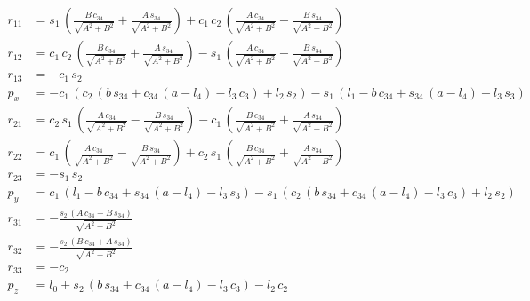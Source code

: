 \documentclass{homework}
\begin{document}
\begin{sol}
\begin{align*} 
r_{11} &= s_{1}\,\left(\frac{B\,c_{34}}{\sqrt{A^2+B^2}}+\frac{A\,s_{34}}{\sqrt{A^2+B^2}}\right)+c_{1}\,c_{2}\,\left(\frac{A\,c_{34}}{\sqrt{A^2+B^2}}-\frac{B\,s_{34}}{\sqrt{A^2+B^2}}\right) \\ 
r_{12} &= c_{1}\,c_{2}\,\left(\frac{B\,c_{34}}{\sqrt{A^2+B^2}}+\frac{A\,s_{34}}{\sqrt{A^2+B^2}}\right)-s_{1}\,\left(\frac{A\,c_{34}}{\sqrt{A^2+B^2}}-\frac{B\,s_{34}}{\sqrt{A^2+B^2}}\right) \\ 
r_{13} &= -c_{1}\,s_{2} \\ 
p_x &= -c_{1}\,\left(c_{2}\,\left(b\,s_{34}+c_{34}\,\left(a-l_{4}\right)-l_{3}\,c_{3}\right)+l_{2}\,s_{2}\right)-s_{1}\,\left(l_{1}-b\,c_{34}+s_{34}\,\left(a-l_{4}\right)-l_{3}\,s_{3}\right) \\ 
r_{21} &= c_{2}\,s_{1}\,\left(\frac{A\,c_{34}}{\sqrt{A^2+B^2}}-\frac{B\,s_{34}}{\sqrt{A^2+B^2}}\right)-c_{1}\,\left(\frac{B\,c_{34}}{\sqrt{A^2+B^2}}+\frac{A\,s_{34}}{\sqrt{A^2+B^2}}\right) \\ 
r_{22} &= c_{1}\,\left(\frac{A\,c_{34}}{\sqrt{A^2+B^2}}-\frac{B\,s_{34}}{\sqrt{A^2+B^2}}\right)+c_{2}\,s_{1}\,\left(\frac{B\,c_{34}}{\sqrt{A^2+B^2}}+\frac{A\,s_{34}}{\sqrt{A^2+B^2}}\right) \\ 
r_{23} &= -s_{1}\,s_{2} \\ 
p_y &= c_{1}\,\left(l_{1}-b\,c_{34}+s_{34}\,\left(a-l_{4}\right)-l_{3}\,s_{3}\right)-s_{1}\,\left(c_{2}\,\left(b\,s_{34}+c_{34}\,\left(a-l_{4}\right)-l_{3}\,c_{3}\right)+l_{2}\,s_{2}\right) \\ 
r_{31} &= -\frac{s_{2}\,\left(A\,c_{34}-B\,s_{34}\right)}{\sqrt{A^2+B^2}} \\ 
r_{32} &= -\frac{s_{2}\,\left(B\,c_{34}+A\,s_{34}\right)}{\sqrt{A^2+B^2}} \\ 
r_{33} &= -c_{2} \\ 
p_z &= l_{0}+s_{2}\,\left(b\,s_{34}+c_{34}\,\left(a-l_{4}\right)-l_{3}\,c_{3}\right)-l_{2}\,c_{2}
\end{align*}

\end{sol}
\end{document}
